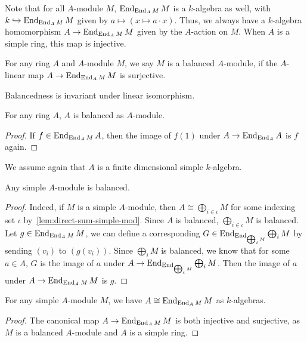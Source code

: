 \begin{remark}
Note that for all $A$-module $M$, $\operatorname{End}_{\operatorname{End}_{A}M}M$ is a $k$-algebra as well, with $k \hookrightarrow \operatorname{End}_{\operatorname{End}_{A}M}M$ given by $a \mapsto (x \mapsto a\cdot x)$. Thus, we always have a $k$-algebra homomorphism $A \to \operatorname{End}_{\operatorname{End}_{A}M}M$ given by the $A$-action on $M$. When $A$ is a simple ring, this map is injective.
\end{remark}

\begin{definition}\label{def:balanced-mod}
  \leanok
  For any ring $A$ and $A$-module $M$, we say $M$ is a balanced $A$-module, if the $A$-linear map $A \to \operatorname{End}_{\operatorname{End}_{A}M}M$ is surjective.
\end{definition}

\begin{remark}
  Balancedness is invariant under linear isomorphism.
\end{remark}

\begin{lemma}\label{lem:balanced-self}
  For any ring $A$, $A$ is balanced as $A$-module.
  \leanok
\end{lemma}
\begin{proof}
  If $f \in \operatorname{End}_{\operatorname{End}_{A}M}A$, then the image of $f(1)$ under $A \to\operatorname{End}_{\operatorname{End}_{A}}A$ is $f$ again.
\end{proof}

We assume again that $A$ is a finite dimensional simple $k$-algebra.
\begin{lemma}
  Any simple $A$-module is balanced.
  \leanok
\end{lemma}
\begin{proof}
  Indeed, if $M$ is a simple $A$-module, then $A \cong \bigoplus_{i\in\iota} M$ for some indexing set $\iota$ by~\cref{lem:direct-sum-simple-mod}. Since $A$ is balanced, $\bigoplus_{i\in\iota}M$ is balanced. Let $g \in \operatorname{End}_{\operatorname{End}_{A}M}M$, we can define a corresponding $G \in \operatorname{End}_{\operatorname{End}_{\bigoplus_{i}M}}\bigoplus_{i}M$ by sending $(v_{i})$ to $(g(v_{i}))$. Since $\bigoplus_{i}M$ is balanced, we know that for some $a\in A$, $G$ is the image of $a$ under $A \to \operatorname{End}_{\operatorname{End}_{\bigoplus_{i}M}}\bigoplus_{i}M$. Then the image of $a$ under $A \to \operatorname{End}_{\operatorname{End}_{A}M}M$ is $g$.
\end{proof}

\begin{lemma}\label{lem:iso-end-end}
  For any simple $A$-module $M$, we have $A \cong \operatorname{End}_{\operatorname{End}_{A}M}M$ as $k$-algebras.
\end{lemma}
\begin{proof}
  The canonical map $A \to \operatorname{End}_{\operatorname{End}_{A}M}M$ is both injective and surjective, as $M$ is a balanced $A$-module and $A$ is a simple ring.
\end{proof}

